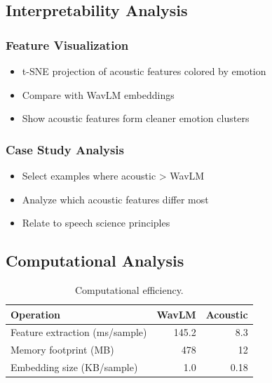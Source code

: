 \subsection{Interpretability Analysis}
\label{subsec:interpretability}

\subsubsection{Feature Visualization}
\begin{itemize}
    \item t-SNE projection of acoustic features colored by emotion
    \item Compare with WavLM embeddings
    \item Show acoustic features form cleaner emotion clusters
\end{itemize}

\subsubsection{Case Study Analysis}
\begin{itemize}
    \item Select examples where acoustic > WavLM
    \item Analyze which acoustic features differ most
    \item Relate to speech science principles
\end{itemize}

\subsection{Computational Analysis}
\label{subsec:computational}

\begin{table}[t]
\centering
\small
\begin{tabular}{lrr}
\toprule
\textbf{Operation} & \textbf{WavLM} & \textbf{Acoustic} \\
\midrule
Feature extraction (ms/sample) & 145.2 & 8.3 \\
Memory footprint (MB) & 478 & 12 \\
Embedding size (KB/sample) & 1.0 & 0.18 \\
\bottomrule
\end{tabular}
\caption{Computational efficiency.}
\label{tab:computation}
\end{table}
